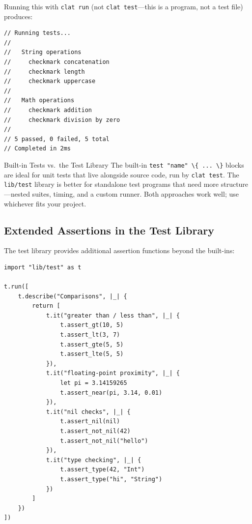 Running this with \lstinline|clat run| (not \lstinline|clat test|---this is a program, not a test file) produces:

\begin{lstlisting}[language=Lattice, caption={Structured test output}]
// Running tests...
//
//   String operations
//     checkmark concatenation
//     checkmark length
//     checkmark uppercase
//
//   Math operations
//     checkmark addition
//     checkmark division by zero
//
// 5 passed, 0 failed, 5 total
// Completed in 2ms
\end{lstlisting}

\begin{notebox}{Built-in Tests vs.\ the Test Library}
The built-in \lstinline|test "name" \{ ... \}| blocks are ideal for unit tests that live alongside source code, run by \lstinline|clat test|.
The \lstinline|lib/test| library is better for standalone test programs that need more structure---nested suites, timing, and a custom runner.
Both approaches work well; use whichever fits your project.
\end{notebox}

\subsection{Extended Assertions in the Test Library}\label{sec:test-lib-assertions}

The test library provides additional assertion functions beyond the built-ins:

\begin{lstlisting}[language=Lattice, caption={Extended assertions from lib/test}]
import "lib/test" as t

t.run([
    t.describe("Comparisons", |_| {
        return [
            t.it("greater than / less than", |_| {
                t.assert_gt(10, 5)
                t.assert_lt(3, 7)
                t.assert_gte(5, 5)
                t.assert_lte(5, 5)
            }),
            t.it("floating-point proximity", |_| {
                let pi = 3.14159265
                t.assert_near(pi, 3.14, 0.01)
            }),
            t.it("nil checks", |_| {
                t.assert_nil(nil)
                t.assert_not_nil(42)
                t.assert_not_nil("hello")
            }),
            t.it("type checking", |_| {
                t.assert_type(42, "Int")
                t.assert_type("hi", "String")
            })
        ]
    })
])
\end{lstlisting}

